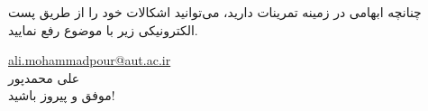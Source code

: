 {چنانچه ابهامی در زمینه تمرینات دارید، می‌توانید اشکالات خود را از طریق پست الکترونیکی زیر با موضوع
    \textbf{}
رفع نمایید.
    \begin{flushleft}
    \href{mailto:ali.mohammadpour@aut.ac.ir}{ali.mohammadpour@aut.ac.ir}\\
علی محمدپور\\
موفق و پیروز باشید!
    \end{flushleft}
}
